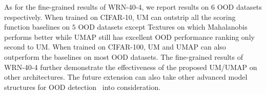\documentclass{article}
\theoremstyle{plain}
\theoremstyle{definition}
\theoremstyle{remark}
\begin{document}
As for the fine-grained results of WRN-40-4, we report results on $6$ OOD datasets respectively. When trained on CIFAR-10, UM can outstrip all the scoring function baselines on $5$ OOD datasets except Textures on which Mahalanobis performs better while UMAP still has excellent OOD performance ranking only second to UM. When trained on CIFAR-100, UM and UMAP can also outperform the baselines on most OOD datasets. The fine-grained results of WRN-40-4 further demonstrate the effectiveness of the proposed UM/UMAP on other architectures. The future extension can also take other advanced model structures for OOD detection~\citep{ming2022delving} into consideration. 

\begin{table}[t!]
    \caption{Fine-grained Results of WRN-40-4 on CIFAR-10 ($\%$). Comparison on different OOD benchmark datasets. $\uparrow$ indicates higher values are better, and $\downarrow$ indicates lower values are better.}
    \vspace{2mm}
    \centering
    \footnotesize
    \renewcommand\arraystretch{0.95}
\end{table}
\end{document}
